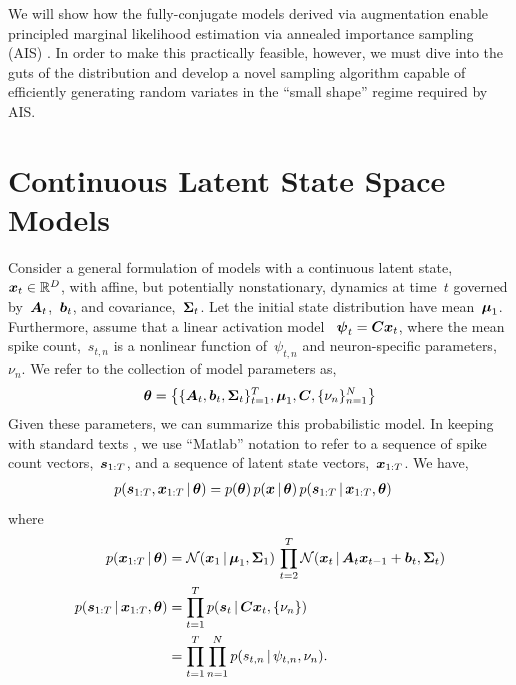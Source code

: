 We will show how the fully-conjugate models derived via \polyagamma
augmentation enable principled marginal likelihood estimation
via annealed importance sampling (AIS) \citep{neal2001annealed}. In order
to make this practically feasible, however, we must dive into the
guts of the \polyagamma distribution and develop a novel sampling
algorithm capable of efficiently generating random variates in the
``small shape'' regime required by AIS. 
 
 
\section{Continuous Latent State Space Models}
Consider a general formulation of models with a continuous latent
state,~$\boldsymbol{x}_t \in \mathbb{R}^D$, with affine, but potentially nonstationary,
dynamics at time~$t$ governed by~$\boldsymbol{A}_t$,~$\boldsymbol{b}_t$, and
covariance,~$\boldsymbol{\Sigma}_t$. Let the initial state distribution have 
mean~$\boldsymbol{\mu}_1$. Furthermore, assume that a linear activation model
~$\boldsymbol{\psi}_t = \boldsymbol{C} \boldsymbol{x}_t$, where the mean spike count,~$s_{t,n}$ is 
a nonlinear function of~$\psi_{t,n}$ and neuron-specific parameters,~$\nu_n$.
We refer to the collection of model parameters as,
\begin{align*}
  \boldsymbol{\theta} = \left\{ \{\boldsymbol{A}_t, \boldsymbol{b}_t, \boldsymbol{\Sigma}_t\}_{t=1}^T, \boldsymbol{\mu}_1, \boldsymbol{C}, \{\nu_n\}_{n=1}^N \right\}
\end{align*}
Given these parameters, we can summarize this probabilistic model.  In
keeping with standard texts \citep[e.g.][Chapter
18]{murphy2012probabilistic}, we use ``Matlab'' notation to refer to
a sequence of spike count vectors,~$\boldsymbol{s}_{1:T}$, and a sequence of
latent state vectors,~$\boldsymbol{x}_{1:T}$. We have,
\begin{align*}
  p(\boldsymbol{s}_{1:T}, \boldsymbol{x}_{1:T} \,|\,  \boldsymbol{\theta}) 
  &= 
    p(\boldsymbol{\theta}) \, p (\boldsymbol{x} \,|\, \boldsymbol{\theta}) \, p(\boldsymbol{s}_{1:T} \,|\, \boldsymbol{x}_{1:T}, \boldsymbol{\theta})
\end{align*}
where
\begin{align}
  \nonumber
  p(\boldsymbol{x}_{1:T} \,|\, \boldsymbol{\theta}) 
  &= 
    \mathcal{N}(\boldsymbol{x}_1 \,|\, \boldsymbol{\mu}_1, \boldsymbol{\Sigma}_1) \,
    \prod_{t=2}^T \mathcal{N}(\boldsymbol{x}_t \,|\, \boldsymbol{A}_t \boldsymbol{x}_{t-1} + \boldsymbol{b}_t, \boldsymbol{\Sigma}_t)
  \\
  \nonumber
  p(\boldsymbol{s}_{1:T} \,|\, \boldsymbol{x}_{1:T}, \boldsymbol{\theta}) 
  &= 
    \prod_{t=1}^T p(\boldsymbol{s}_{t} \,|\, \boldsymbol{C} \boldsymbol{x}_t, \{\nu_n\}) \\
  \label{eq:s_likelihood}
  &=
    \prod_{t=1}^T \prod_{n=1}^N p(s_{t,n} \,|\, \psi_{t,n}, \nu_n).
\end{align}

